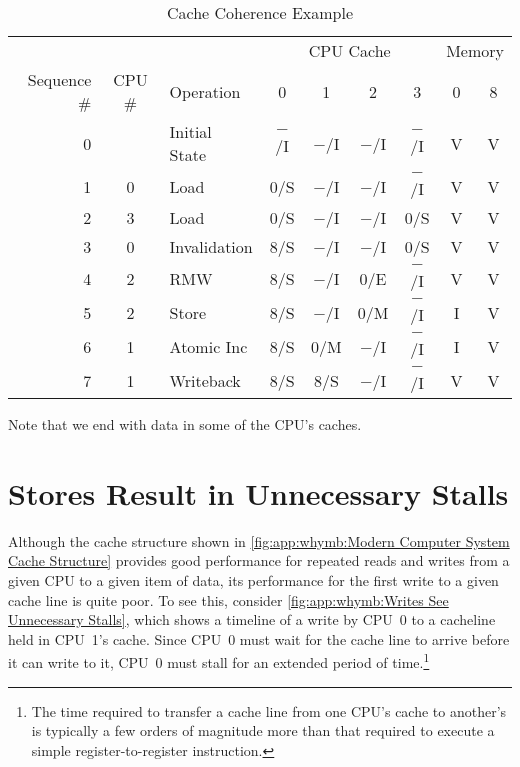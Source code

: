 \begin{table*}
\small
\centering
\renewcommand*{\arraystretch}{1.2}
\begin{tabular}{rclcccccc}
	\toprule
	& & & \multicolumn{4}{c}{CPU Cache} & \multicolumn{2}{c}{Memory} \\
	\cmidrule(lr){4-7} \cmidrule(l){8-9}
	Sequence \# & CPU \# & Operation & 0 & 1 & 2 & 3 & 0 & 8 \\
	\cmidrule(r){1-3} \cmidrule(lr){4-7} \cmidrule(l){8-9}
	0 &   & Initial State	& $-$/I & $-$/I & $-$/I & $-$/I   & V & V \\
	1 & 0 & Load		& 0/S &   $-$/I & $-$/I & $-$/I   & V & V \\
	2 & 3 & Load		& 0/S &   $-$/I & $-$/I & 0/S     & V & V \\
	3 & 0 & Invalidation	& 8/S &   $-$/I & $-$/I & 0/S     & V & V \\
	4 & 2 & RMW		& 8/S &   $-$/I & 0/E &   $-$/I   & V & V \\
	5 & 2 & Store		& 8/S &   $-$/I & 0/M &   $-$/I   & I & V \\
	6 & 1 & Atomic Inc	& 8/S &   0/M &   $-$/I & $-$/I   & I & V \\
	7 & 1 & Writeback	& 8/S &   8/S &   $-$/I & $-$/I   & V & V \\
	\bottomrule
\end{tabular}
\caption{Cache Coherence Example}
\label{tab:app:whymb:Cache Coherence Example}
\end{table*}

Note that we end with data in some of the CPU's caches.

\QuickQuizEnd

\section{Stores Result in Unnecessary Stalls}
\label{sec:app:whymb:Stores Result in Unnecessary Stalls}

Although the cache structure shown in
\cref{fig:app:whymb:Modern Computer System Cache Structure}
provides good performance for repeated reads and writes from a given CPU
to a given item of data, its performance for the first write to
a given cache line is quite poor.
To see this, consider
\cref{fig:app:whymb:Writes See Unnecessary Stalls},
which shows a timeline of a write by CPU~0 to a cacheline held in
CPU~1's cache.
Since CPU~0 must wait for the cache line to arrive before it can
write to it, CPU~0 must stall for an extended period of time.\footnote{
	The time required to transfer a cache line from one CPU's cache
	to another's is typically a few orders of magnitude more than
	that required to execute a simple register-to-register instruction.}


